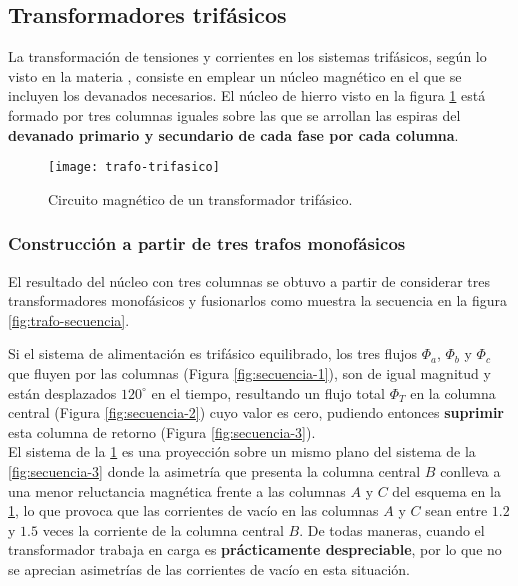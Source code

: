\subsection{Transformadores trifásicos}
La transformación de tensiones y corrientes en los sistemas trifásicos, según lo visto en la materia \materia, consiste en emplear un núcleo magnético en el que se incluyen los devanados necesarios. El núcleo de hierro visto en la figura \ref{fig:trafo-trifasico} está formado por tres columnas iguales sobre las que se arrollan las espiras del \textbf{devanado primario y secundario de cada fase por cada columna}.

\begin{figure}[H]
	\centering
	\texttt{[image: trafo-trifasico]}
	\caption{Circuito magnético de un transformador trifásico.}
	\label{fig:trafo-trifasico}
\end{figure}

\subsubsection{Construcción a partir de tres trafos monofásicos}

El resultado del núcleo con tres columnas se obtuvo a partir de considerar tres transformadores monofásicos y fusionarlos como muestra la secuencia en la figura \ref{fig:trafo-secuencia}.


Si el sistema de alimentación es trifásico equilibrado, los tres flujos $\Phi_a$, $\Phi_b$ y $\Phi_c$ que fluyen por las columnas (Figura \ref{fig:secuencia-1}), son de igual magnitud y están desplazados $120^\circ$ en el tiempo, resultando un flujo total $\Phi_T$ en la columna central (Figura \ref{fig:secuencia-2}) cuyo valor es cero, pudiendo entonces \textbf{suprimir} esta columna de retorno (Figura \ref{fig:secuencia-3}).\\

El sistema de la \ref{fig:trafo-trifasico} es una proyección sobre un mismo plano del sistema de la \ref{fig:secuencia-3} donde la asimetría que presenta la columna central $B$ conlleva a una menor reluctancia magnética frente a las columnas $A$ y $C$ del esquema en la \ref{fig:trafo-trifasico}, lo que provoca que las corrientes de vacío en las columnas $A$ y $C$ sean entre $1.2$ y $1.5$ veces la corriente de la columna central $B$. De todas maneras, cuando el transformador trabaja en carga es \textbf{prácticamente despreciable}, por lo que no se aprecian asimetrías de las corrientes de vacío en esta situación.

